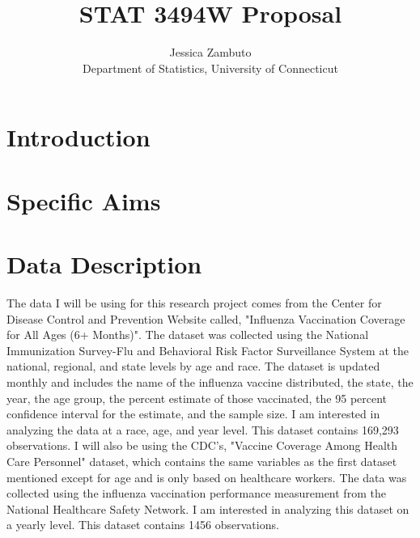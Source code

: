 \documentclass[12pt]{article}
\title{STAT 3494W Proposal}
\author{Jessica Zambuto\\
Department of Statistics, University of Connecticut}
\begin{document}
\maketitle

\section{Introduction}
\label{sec:intro}


\section{Specific Aims}
\label{sec:aims}

\section{Data Description}
\label{sec:data}
The data I will be using for this research project comes from the Center for Disease Control and Prevention Website called, 
"Influenza Vaccination Coverage for All Ages (6+ Months)". The dataset was collected using the National Immunization Survey-Flu and 
Behavioral Risk Factor Surveillance System at the national, regional, and state levels by age and race. The dataset is updated monthly and 
includes the name of the influenza vaccine distributed, the state, the year, the age group, the percent estimate of those vaccinated, 
the 95 percent confidence interval for the estimate, and the sample size. I am interested in analyzing the data at a race, age, and year 
level. This dataset contains 169,293 observations. I will also be using the CDC's, "Vaccine Coverage Among Health Care Personnel" dataset, 
which contains the same variables as the first dataset mentioned except for age and is only based on healthcare workers. The data was collected 
using the influenza vaccination performance measurement from the National Healthcare Safety Network. I am interested in analyzing this dataset 
on a yearly level. This dataset contains 1456 observations. 
\end{document}
